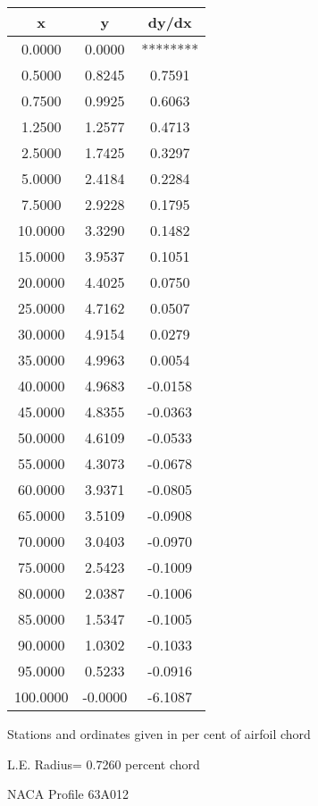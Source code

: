 \documentclass[11pt]{book}
\begin{document}
 \vspace{8mm}
 \begin{tabular}{|c|c|c|} \hline 
  x  &  y  &  dy/dx \\
 \hline
0.0000 & 0.0000 & ******** \\
0.5000 & 0.8245 & 0.7591 \\
0.7500 & 0.9925 & 0.6063 \\
1.2500 & 1.2577 & 0.4713 \\
2.5000 & 1.7425 & 0.3297 \\
5.0000 & 2.4184 & 0.2284 \\
7.5000 & 2.9228 & 0.1795 \\
10.0000 & 3.3290 & 0.1482 \\
15.0000 & 3.9537 & 0.1051 \\
20.0000 & 4.4025 & 0.0750 \\
25.0000 & 4.7162 & 0.0507 \\
30.0000 & 4.9154 & 0.0279 \\
35.0000 & 4.9963 & 0.0054 \\
40.0000 & 4.9683 & -0.0158 \\
45.0000 & 4.8355 & -0.0363 \\
50.0000 & 4.6109 & -0.0533 \\
55.0000 & 4.3073 & -0.0678 \\
60.0000 & 3.9371 & -0.0805 \\
65.0000 & 3.5109 & -0.0908 \\
70.0000 & 3.0403 & -0.0970 \\
75.0000 & 2.5423 & -0.1009 \\
80.0000 & 2.0387 & -0.1006 \\
85.0000 & 1.5347 & -0.1005 \\
90.0000 & 1.0302 & -0.1033 \\
95.0000 & 0.5233 & -0.0916 \\
100.0000 & -0.0000 & -6.1087 \\
 \hline
 \end{tabular}
 \vspace{8mm}


Stations and ordinates given in per cent of airfoil chord 


L.E. Radius=  0.7260 percent chord
 \newpage
  \label{p63A012}
 \begin{Large}
 NACA Profile 63A012
 \end{Large}
  
\end{document}
